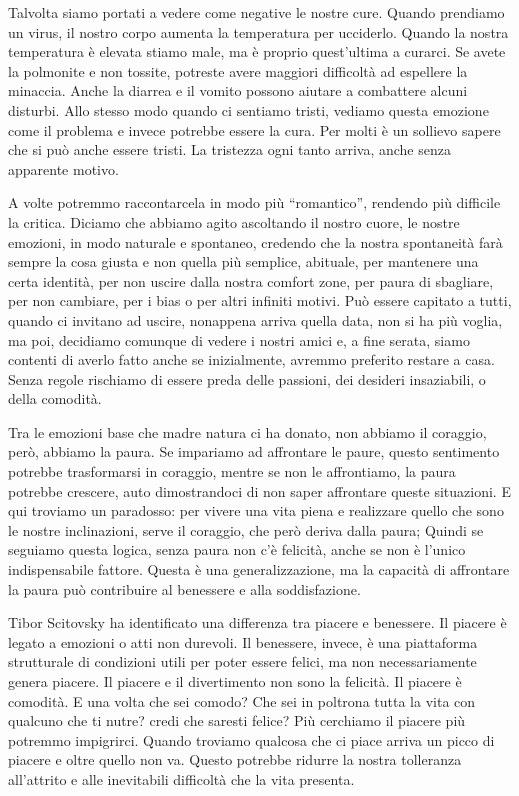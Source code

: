 \documentclass[12pt]{book} %
\begin{document}
Talvolta siamo portati a vedere come negative le nostre cure. Quando prendiamo un virus, il nostro corpo aumenta la temperatura per ucciderlo. Quando la nostra temperatura è elevata stiamo male, ma è proprio quest'ultima a curarci. Se avete la polmonite e non tossite, potreste avere maggiori difficoltà ad espellere la minaccia. Anche la diarrea e il vomito possono aiutare a combattere alcuni disturbi. Allo stesso modo quando ci sentiamo tristi, vediamo questa emozione come il problema e invece potrebbe essere la cura. 
Per molti è un sollievo sapere che si può anche essere tristi. La tristezza ogni tanto arriva, anche senza apparente motivo.

A volte potremmo raccontarcela in modo più “romantico”, rendendo più difficile la critica. Diciamo che abbiamo agito ascoltando il nostro cuore, le nostre emozioni, in modo naturale e spontaneo, credendo che la nostra spontaneità farà sempre la cosa giusta e non quella più semplice, abituale, per mantenere una certa identità, per non uscire dalla nostra comfort zone, per paura di sbagliare, per non cambiare, per i bias o per altri infiniti motivi. Può essere capitato a tutti, quando ci invitano ad uscire, nonappena arriva quella data, non si ha più voglia, ma poi, decidiamo comunque di vedere i nostri amici e, a fine serata, siamo contenti di averlo fatto anche se inizialmente, avremmo preferito restare a casa. Senza regole rischiamo di essere preda delle passioni, dei desideri insaziabili, o della comodità.

Tra le emozioni base che madre natura ci ha donato, non abbiamo il coraggio, però, abbiamo la paura. Se impariamo ad affrontare le paure, questo sentimento potrebbe trasformarsi in coraggio, mentre se non le affrontiamo, la paura potrebbe crescere, auto dimostrandoci di non saper affrontare queste situazioni. E qui troviamo un paradosso: per vivere una vita piena e realizzare quello che sono le nostre inclinazioni, serve il coraggio, che però deriva dalla paura; Quindi se seguiamo questa logica, senza paura non c'è felicità, anche se non è l’unico indispensabile fattore. Questa è una generalizzazione, ma la capacità di affrontare la paura può contribuire al benessere e alla soddisfazione. 

Tibor Scitovsky ha identificato una differenza tra piacere e benessere. Il piacere è legato a emozioni o atti non durevoli. Il benessere, invece, è una piattaforma strutturale di condizioni utili per poter essere felici, ma non necessariamente genera piacere. 
Il piacere e il divertimento non sono la felicità. Il piacere è comodità. E una volta che sei comodo? Che sei in poltrona tutta la vita con qualcuno che ti nutre? credi che saresti felice?
Più cerchiamo il piacere più potremmo impigrirci. Quando troviamo qualcosa che ci piace arriva un picco di piacere e oltre quello non va. Questo potrebbe ridurre la nostra tolleranza all'attrito e alle inevitabili difficoltà che la vita presenta.
\end{document}
